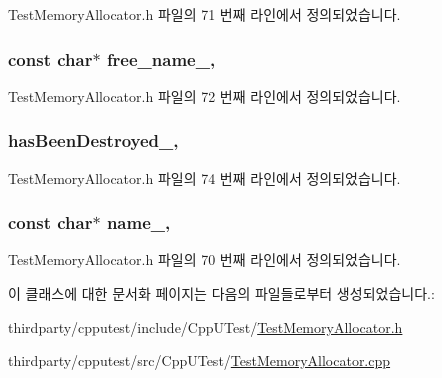 Test\+Memory\+Allocator.\+h 파일의 71 번째 라인에서 정의되었습니다.

\subsubsection[{\texorpdfstring{free\+\_\+name\+\_\+}{free_name_}}]{\setlength{\rightskip}{0pt plus 5cm}const char$\ast$ free\+\_\+name\+\_\+\hspace{0.3cm}{\ttfamily [protected]}, {\ttfamily [inherited]}}\hypertarget{class_test_memory_allocator_a4f7ece205625129df190e624cccf9286}{}\label{class_test_memory_allocator_a4f7ece205625129df190e624cccf9286}


Test\+Memory\+Allocator.\+h 파일의 72 번째 라인에서 정의되었습니다.

\subsubsection[{\texorpdfstring{has\+Been\+Destroyed\+\_\+}{hasBeenDestroyed_}}]{ has\+Been\+Destroyed\+\_\+\hspace{0.3cm}{\ttfamily [protected]}, {\ttfamily [inherited]}}\hypertarget{class_test_memory_allocator_a971604f223534e64d5024d63396b397a}{}\label{class_test_memory_allocator_a971604f223534e64d5024d63396b397a}


Test\+Memory\+Allocator.\+h 파일의 74 번째 라인에서 정의되었습니다.

\subsubsection[{\texorpdfstring{name\+\_\+}{name_}}]{\setlength{\rightskip}{0pt plus 5cm}const char$\ast$ name\+\_\+\hspace{0.3cm}{\ttfamily [protected]}, {\ttfamily [inherited]}}\hypertarget{class_test_memory_allocator_a7dac8366c11fbcad2f49d85fe8fc4fbe}{}\label{class_test_memory_allocator_a7dac8366c11fbcad2f49d85fe8fc4fbe}


Test\+Memory\+Allocator.\+h 파일의 70 번째 라인에서 정의되었습니다.



이 클래스에 대한 문서화 페이지는 다음의 파일들로부터 생성되었습니다.\+:\begin{DoxyCompactItemize}
\item 
thirdparty/cpputest/include/\+Cpp\+U\+Test/\hyperlink{_test_memory_allocator_8h}{Test\+Memory\+Allocator.\+h}\item 
thirdparty/cpputest/src/\+Cpp\+U\+Test/\hyperlink{_test_memory_allocator_8cpp}{Test\+Memory\+Allocator.\+cpp}\end{DoxyCompactItemize}
